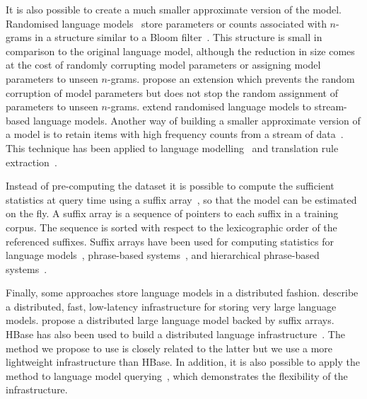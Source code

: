 It is also possible to create a much smaller approximate version of the model.
Randomised language
models~\citep{talbot-osborne:2007:ACL,talbot-osborne:2007:EMNLP-CoNLL,talbot-brants:2008:ACL}
store parameters or counts associated with $n$-grams in a structure similar to a
Bloom filter~\citep{bloom:1970:ACM}. This structure is small in comparison to
the original language model, although the reduction in size comes at the cost of
randomly corrupting model parameters or assigning model parameters to unseen
$n$-grams. \citet{guthrie-hepple:2010:EMNLP} propose an extension which prevents
the random corruption of model parameters but does not stop the random
assignment of parameters to unseen $n$-grams.
\citet{levenberg-osborne:2009:EMNLP} extend randomised language models to
stream-based language models. Another way of building a smaller approximate
version of a model is to retain items with high frequency counts from a stream
of data~\citep{manku-motwani:2002:VLDB}. This technique has been applied to
language modelling~\citep{goyal-daumeiii-venkatasubramanian:2009:NAACL} and
translation rule extraction~\citep{przywara-bojar:2011:PBML}. 

Instead of pre-computing the dataset it is possible to compute the sufficient
statistics at query time using a suffix array~\citep{manber-myers:1990:SIAM}, so
that the model can be estimated on the fly. A suffix array is a sequence of
pointers to each suffix in a training corpus. The sequence is sorted with
respect to the lexicographic order of the referenced suffixes. Suffix arrays
have been used for computing statistics for language
models~\citep{zhang-vogel:2006:techreport}, phrase-based
systems~\citep{callisonburch-bannard-schroeder:2005:ACL,zhang-vogel:2005:EAMT},
and hierarchical phrase-based systems~\citep{lopez:2007:EMNLP-CoNLL}.

Finally, some approaches store language models in a distributed fashion.
\citet{brants-popat-xu-och-dean:2007:EMNLP-CoNLL} describe a distributed, fast,
low-latency infrastructure for storing very large language models.
\citet{zhang-hildebrand-vogel:2006:EMNLP} propose a distributed large language
model backed by suffix arrays. HBase has also been used to build a distributed
language infrastructure~\citep{yu:2008:mastersthesis}. The method we propose to
use is closely related to the latter but we use a more lightweight
infrastructure than HBase. In addition, it is also possible to apply the method
to language model querying~\citep{pino-waite-byrne:2012:PBML}, which
demonstrates the flexibility of the infrastructure.

